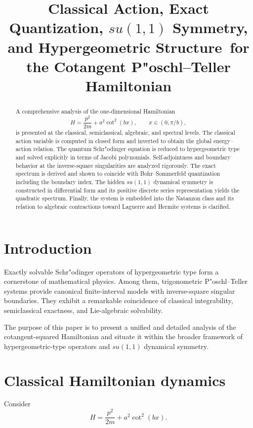 \documentclass[11pt]{article}
\title{Classical Action, Exact Quantization, $su(1,1)$ Symmetry, and Hypergeometric Structure\
for the Cotangent P"oschl--Teller Hamiltonian}
\author{}
\date{}
\begin{document}
\maketitle

\begin{abstract}
A comprehensive analysis of the one-dimensional Hamiltonian
\[
H=\frac{p^2}{2m}+a^2\cot^2(bx), \qquad x\in(0,\pi/b),
\]
is presented at the classical, semiclassical, algebraic, and
spectral levels. The classical action variable is computed in closed
form and inverted to obtain the global energy--action relation. The
quantum Schr"odinger equation is reduced to hypergeometric type and
solved explicitly in terms of Jacobi polynomials. Self-adjointness and
boundary behavior at the inverse-square singularities are analyzed
rigorously. The exact spectrum is derived and shown to coincide with
Bohr--Sommerfeld quantization including the boundary index. The hidden
$su(1,1)$ dynamical symmetry is constructed in differential form and
its positive discrete series representation yields the quadratic
spectrum. Finally, the system is embedded into the Natanzon class and
its relation to algebraic contractions toward Laguerre and Hermite
systems is clarified.
\end{abstract}

\tableofcontents

\section{Introduction}

Exactly solvable Schr"odinger operators of hypergeometric type form a
cornerstone of mathematical physics. Among them, trigonometric
P"oschl--Teller systems provide canonical finite-interval models with
inverse-square singular boundaries. They exhibit a remarkable
coincidence of classical integrability, semiclassical exactness, and
Lie-algebraic solvability.

The purpose of this paper is to present a unified and detailed
analysis of the cotangent-squared Hamiltonian and situate it within the
broader framework of hypergeometric-type operators and $su(1,1)$
dynamical symmetry.

\section{Classical Hamiltonian dynamics}

Consider
\begin{equation}
H=\frac{p^2}{2m}+a^2\cot^2(bx).
\end{equation}
\end{document}

